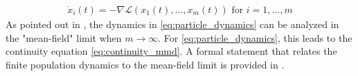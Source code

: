 \begin{align}\label{eq:particle_dynamics}
	\dot{x}_i(t)= -\nabla \mathcal{L}(x_1(t),...,x_m(t)) \text{ for } i=1, \dots, m
\end{align}  
As pointed out in \cite{chizat2018global,Rotskoff:2019}, the dynamics in \cref{eq:particle_dynamics} can be analyzed in the "mean-field" limit when $m\rightarrow \infty$. For \cref{eq:particle_dynamics}, this leads to the continuity equation \cref{eq:continuity_mmd}. A formal statement that relates the finite population dynamics to the mean-field limit is provided in . 





%

